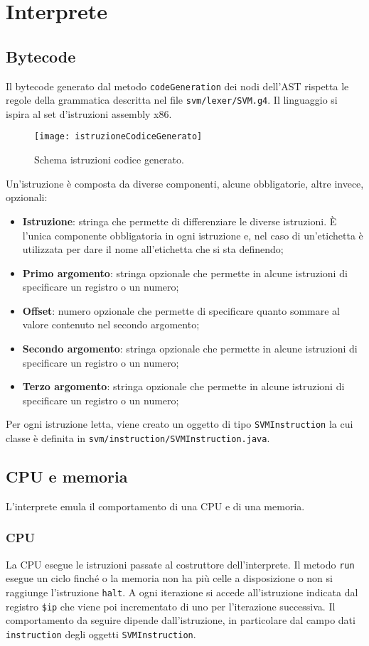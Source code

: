 \documentclass[../report.tex]{subfiles}
\begin{document}
\chapter{Interprete}\label{c:interprete}
\section{Bytecode}\label{s:bytecode}
Il bytecode generato dal metodo \verb|codeGeneration| dei nodi dell'AST rispetta le regole della grammatica descritta nel file \verb|svm/lexer/SVM.g4|. Il linguaggio si ispira al set d'istruzioni assembly x86. 
\begin{figure}[H]
    \centering
    \texttt{[image: istruzioneCodiceGenerato]}
    \caption{Schema istruzioni codice generato.}
    \label{fig:istruzione-codice-generato}
\end{figure}
Un'istruzione \`e composta da diverse componenti, alcune obbligatorie, altre invece, opzionali:
\begin{itemize}
    \item \textbf{Istruzione}: stringa che permette di differenziare le diverse istruzioni. \`E l'unica componente obbligatoria in ogni istruzione e, nel caso di un'etichetta \`e utilizzata per dare il nome all'etichetta che si sta definendo;
    \item \textbf{Primo argomento}: stringa opzionale che permette in alcune istruzioni di specificare un registro o un numero;
    \item \textbf{Offset}: numero opzionale che permette di specificare quanto sommare al valore contenuto nel secondo argomento;
    \item \textbf{Secondo argomento}: stringa opzionale che permette in alcune istruzioni di specificare un registro o un numero;
    \item \textbf{Terzo argomento}: stringa opzionale che permette in alcune istruzioni di specificare un registro o un numero;
\end{itemize}
Per ogni istruzione letta, viene creato un oggetto di tipo \verb|SVMInstruction| la cui classe \`e definita in \verb|svm/instruction/SVMInstruction.java|.
\section{CPU e memoria}\label{s:cpu-e-memoria}
L'interprete emula il comportamento di una CPU e di una memoria.
\subsection{CPU}
La CPU esegue le istruzioni passate al costruttore dell'interprete. Il metodo \verb|run| esegue un ciclo finch\'e o la memoria non ha pi\`u celle a disposizione o non si raggiunge l'istruzione \verb|halt|. A ogni iterazione si accede all'istruzione indicata dal registro \verb|$ip| che viene poi incrementato di uno per l'iterazione successiva. Il comportamento da seguire dipende dall'istruzione, in particolare dal campo dati \verb|instruction| degli oggetti \verb|SVMInstruction|.
\end{document}
